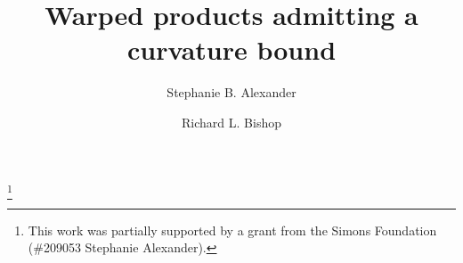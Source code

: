 \documentclass{amsart}
\theoremstyle{plain}
\theoremstyle{definition}
\numberwithin{equation}{section}
\begin{document}
\title{Warped products admitting a curvature bound}
\author{Stephanie B. Alexander}\thanks
{This work was partially supported by a grant from the Simons Foundation (\#209053  Stephanie
 Alexander).}
\address{1409 W. Green St., Urbana, Illinois 61801}

\author{Richard L. Bishop}
\address{1409 W. Green St., Urbana, Illinois 61801}

\end{document}
